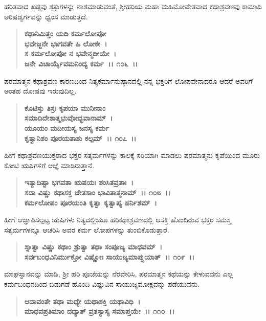 ಹರಿತವಾದ ಖಡ್ಗವು ಶತ್ರುಗಳನ್ನು ನಾಶಮಾಡುವಂತೆ, ಶ‍್ರೀಹರಿಯ ಮಹಾ ಮಹಿಮೋಪೇತವಾದ ಕಥಾಶ್ರವಣವು ಕಾಮಾದಿ ಅರಿಷಡ್ವರ್ಗವನ್ನು ಧ್ವಂಸ ಮಾಡುತ್ತದೆ.

\begin{verse}
\textbf{ಕಥಾನಿಮಿತ್ತಂ ಯದಿ ಕರ್ಮಲೋಪೋ}\\\textbf{ಭವೇಜ್ಜನೇ ಭಾಗವತೇ ಹಿ ಲೋಕೇ~। }\\\textbf{ಸ ಕರ್ಮಲೋಪೋ ನ ಭವೇನ್ಮದೀಯೇ~।} \\\textbf{ಜನೇ ವಿಚಾರ್ಯೈವಮನಿಂದ್ಯ ಕರ್ಮ~।। ೧೦೬~।।}
\end{verse}

ಪರಮಾತ್ಮನ ಕಥಾಶ್ರವಣ ಕಾರಣದಿಂದ ನಿತ್ಯಕರ್ಮಾನುಷ್ಠಾನದಲ್ಲಿ ನನ್ನ ಭಕ್ತರಿಗೆ ಲೋಪವೇನಾದರೂ ಆದರೆ ಅವರಿಗೆ ಅಂತಹ ದೋಷವು ಇರುವುದಿಲ್ಲ.

\begin{verse}
\textbf{ಕೊಟಿಸ್ತು ತಿಸ್ರಃ ಕೃಪಯಾ ಮುನೀನಾಂ}\\\textbf{ಸಮಾದಿದೇಶಾತ್ಮಭುವೋದ್ಭವಾನಾಮ್~।}\\\textbf{ಯೂಯಂ ಮದೀಯಸ್ಯ ಜನಸ್ಯ ಕರ್ಮ} \\\textbf{ಕೃತ್ವಾನಿಶಂ ಪೂರಯತಾಶು ಕಲ್ಪಮ್~।। ೧೦೭~।।}
\end{verse}

ಹೀಗೆ ಕಥಾಶ್ರವಣಯುಕ್ತರಾದ ಭಕ್ತರ ಸತ್ಕರ್ಮಗಳನ್ನು ಕಾಲಕ್ಕೆ ಸರಿಯಾಗಿ ಮಾಡಲು ಪರಮಾತ್ಮನು ಕೃಪೆಯಿಂದ ಮೂರು ಕೋಟಿ ಋಷಿಗಳಿಗೆ ಆಜ್ಞೆ ಮಾಡಿರುತ್ತಾನೆ.

\begin{verse}
\textbf{ಇತ್ಯಾದಿಷ್ಟಾ ಭಗವತಾ ಋಷಯಃ ಶಂಸಿತವ್ರತಾಃ~।}\\\textbf{ಸದಾ ವಿಷ್ಣು ಕಥಾಸಕ್ತ ಚೇತಸಾಂ ಭಾವಿತಾತ್ಮನಾಮ್~।। ೧೦೮~।। }\\\textbf{ಕರ್ಮಲೋಪಂ ಪೂರಯಂತಿ ಕೃತ್ವಾ ಕೃತ್ವಾಪ್ಯ ಹರ್ನಿಶಮ್~।}
\end{verse}

ಹೀಗೆ ಆಜ್ಞಾಪಿಸಲ್ಪಟ್ಟ ಋಷಿಗಳು ನಿತ್ಯದಲ್ಲಿಯೂ ಹರಿಕಥಾಶ್ರವಣದಲ್ಲಿ ಆಸಕ್ತಿ ಹೊಂದಿರುವ ಭಕ್ತರ ಸಮಸ್ತ ಸತ್ಕರ್ಮಗಳನ್ನೂ ಆಚರಿಸಿ ಅವರ ಕರ್ಮ ಲೋಪಗಳನ್ನು ತುಂಬಿಕೊಡುತ್ತಾರೆ.

\begin{verse}
\textbf{ಸ್ನಾತ್ವಾ ವಿಷ್ಣು ಕಥಾಂ ಶ್ರುತ್ವಾ ತಥಾ ಸಂಪೂಜ್ಯ ಮಾಧವಮ್~।}\\\textbf{ಸರ್ವಬಂಧವಿನಿರ್ಮುಕ್ತೋ ವಿಷ್ಣೋಃ ಸಾಯುಜ್ಯಮಾಪ್ನುಯಾತ್~।। ೧೦೯~।।}
\end{verse}

ಮಾಘಸ್ನಾನವನ್ನು ಮಾಡಿ, ಶ‍್ರೀ ಹರಿ ಪೂಜೆಯನ್ನು ನೆರವೇರಿಸಿ, ಪರಮಾತ್ಮನ ಕಥೆಯನ್ನು ಕೇಳುವವನು ಎಲ್ಲ ಕರ್ಮಬಂಧನದಿಂದ ಬಿಡುಗಡೆ ಹೊಂದಿ ವಿಷ್ಣುವಿನ ಸಾಯುಜ್ಯಮೋಕ್ಷವನ್ನು ಪಡೆಯುವನು.

\begin{verse}
\textbf{ಆದಾವಂತೇ ತಥಾ ಮಧ್ಯೇ ಯಥಾಶಕ್ತಿ ಯಥಾವಿಧಿ~।}\\\textbf{ಮಾಧವಪ್ರತಿಮಾಂ ದದ್ಯಾತ್ ವ್ರತಸ್ಯಾಸ್ಯ ಸಮಾಪ್ತಯೇ~।। ೧೧೦~।।}
\end{verse}

